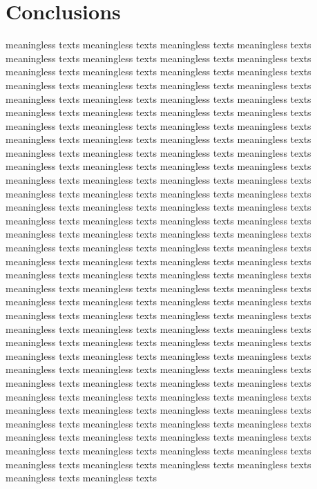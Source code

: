 \documentclass[12pt, twoside, notitlepage, twocolumn]{article}
\begin{document}
    \section{Conclusions}
    meaningless texts meaningless texts meaningless texts meaningless texts meaningless texts 
    meaningless texts meaningless texts meaningless texts meaningless texts meaningless texts 
    meaningless texts meaningless texts meaningless texts meaningless texts meaningless texts 
    meaningless texts meaningless texts meaningless texts meaningless texts meaningless texts 
    meaningless texts meaningless texts meaningless texts meaningless texts meaningless texts 
    meaningless texts meaningless texts meaningless texts meaningless texts meaningless texts 
    meaningless texts meaningless texts meaningless texts meaningless texts meaningless texts 
    meaningless texts meaningless texts meaningless texts meaningless texts meaningless texts 
    meaningless texts meaningless texts meaningless texts meaningless texts meaningless texts 
    meaningless texts meaningless texts meaningless texts meaningless texts meaningless texts 
    meaningless texts meaningless texts meaningless texts meaningless texts meaningless texts 
    meaningless texts meaningless texts meaningless texts meaningless texts meaningless texts 
    meaningless texts meaningless texts meaningless texts meaningless texts meaningless texts 
    meaningless texts meaningless texts meaningless texts meaningless texts meaningless texts 
    meaningless texts meaningless texts meaningless texts meaningless texts meaningless texts 
    meaningless texts meaningless texts meaningless texts meaningless texts meaningless texts 
    meaningless texts meaningless texts meaningless texts meaningless texts meaningless texts 
    meaningless texts meaningless texts meaningless texts meaningless texts meaningless texts 
    meaningless texts meaningless texts meaningless texts meaningless texts meaningless texts 
    meaningless texts meaningless texts meaningless texts meaningless texts meaningless texts 
    meaningless texts meaningless texts meaningless texts meaningless texts meaningless texts 
    meaningless texts meaningless texts meaningless texts meaningless texts meaningless texts 
    meaningless texts meaningless texts meaningless texts meaningless texts meaningless texts 
    meaningless texts meaningless texts meaningless texts meaningless texts meaningless texts 
    meaningless texts meaningless texts meaningless texts meaningless texts meaningless texts 
    meaningless texts meaningless texts meaningless texts meaningless texts meaningless texts 
\end{document}

